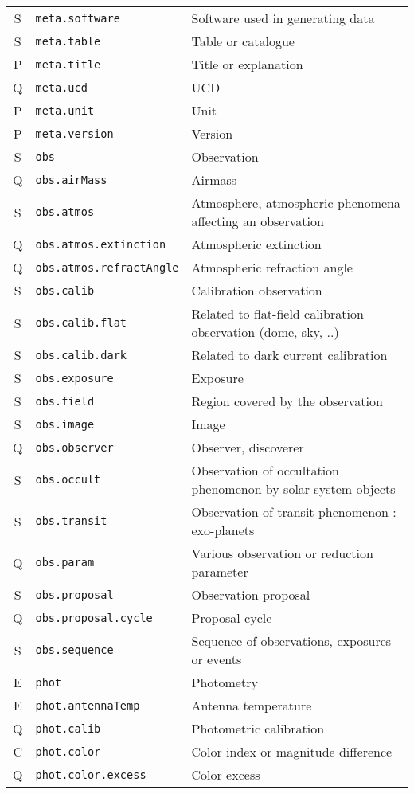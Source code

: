 \documentclass[11pt,a4paper]{ivoa}
\begin{document}
\begin{longtable}[h!]{c|p{40ex}|p{}}
S & {\tt meta.software} & Software used in generating data\\
S & {\tt meta.table} & Table or catalogue\\
P & {\tt meta.title} & Title or explanation\\
Q & {\tt meta.ucd} & UCD\\
P & {\tt meta.unit} & Unit\\
P & {\tt meta.version} & Version\\
S & {\tt obs} & Observation\\
Q & {\tt obs.airMass} & Airmass\\
S & {\tt obs.atmos} & Atmosphere, atmospheric phenomena affecting an observation\\
Q & {\tt obs.atmos.extinction} & Atmospheric extinction\\
Q & {\tt obs.atmos.refractAngle} & Atmospheric refraction angle\\
S & {\tt obs.calib} & Calibration observation\\
S & {\tt obs.calib.flat} & Related to flat-field calibration observation (dome, sky, ..)\\
S & {\tt obs.calib.dark} & Related to dark current calibration\\
S & {\tt obs.exposure} & Exposure\\
S & {\tt obs.field} & Region covered by the observation\\
S & {\tt obs.image} & Image\\
Q & {\tt obs.observer} & Observer, discoverer\\
S & {\tt obs.occult} & Observation of occultation phenomenon by solar system objects\\
S & {\tt obs.transit} & Observation of transit phenomenon  : exo-planets\\
Q & {\tt obs.param} & Various observation or reduction parameter\\
S & {\tt obs.proposal} & Observation proposal\\
Q & {\tt obs.proposal.cycle} & Proposal cycle\\
S & {\tt obs.sequence} & Sequence of observations, exposures or events\\
E & {\tt phot} & Photometry\\
E & {\tt phot.antennaTemp} & Antenna temperature\\
Q & {\tt phot.calib} & Photometric calibration\\
C & {\tt phot.color} & Color index or magnitude difference\\
Q & {\tt phot.color.excess} & Color excess\\

\end{longtable}
\end{document}
